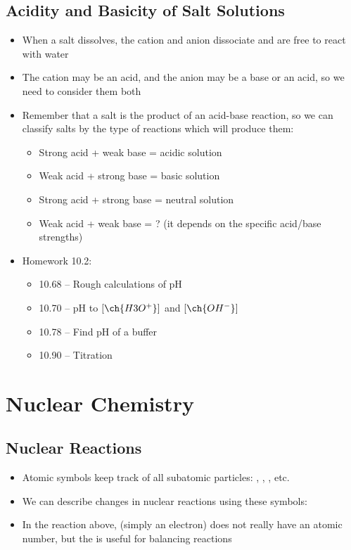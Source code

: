 \documentclass[12pt, openany, letterpaper]{memoir}
\begin{document}
\section{Acidity and Basicity of Salt Solutions}
\begin{itemize}
	\item When a salt dissolves, the cation and anion dissociate and are free to react with water
	\item The cation may be an acid, and the anion may be a base or an acid, so we need to consider them both
	\item Remember that a salt is the product of an acid-base reaction, so we can classify salts by the type of reactions which will produce them:
	      \begin{itemize}
		      \item Strong acid + weak base = acidic solution
		      \item Weak acid + strong base = basic solution
		      \item Strong acid + strong base = neutral solution
		      \item Weak acid + weak base = ? (it depends on the specific acid/base strengths)
	      \end{itemize}
	\item Homework 10.2:
	      \begin{itemize}
		      \item 10.68 -- Rough calculations of pH
		      \item 10.70 -- pH to $\left[\ch{H3O^+}\right]$ and $\left[\ch{OH^-}\right]$
		      \item 10.78 -- Find pH of a buffer
		      \item 10.90 -- Titration
	      \end{itemize}
\end{itemize}

\chapter{Nuclear Chemistry}
\section{Nuclear Reactions}
\begin{itemize}
	\item Atomic symbols keep track of all subatomic particles: , , , etc.
	\item We can describe changes in nuclear reactions using these symbols:

	\item In the reaction above,  (simply an electron) does not really have an atomic number, but the  is useful for balancing reactions
\end{itemize}
\end{document}
